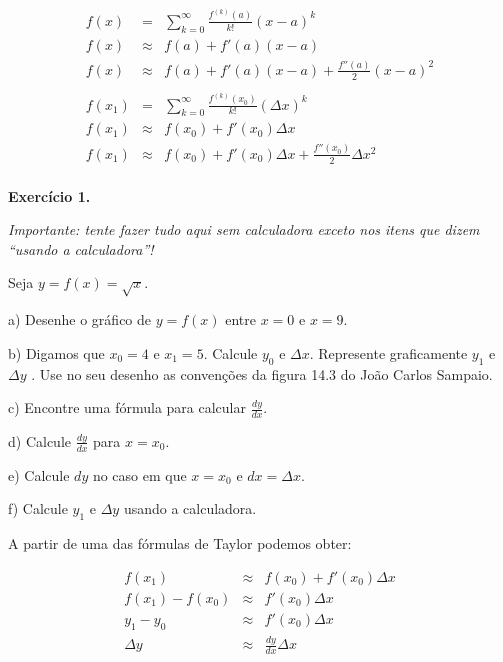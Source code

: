 \documentclass[oneside,12pt]{article}
\begin{document}
%
$$\begin{array}{rcl}
  f(x) &=& \displaystyle \sum_{k=0}^∞ \frac{f^{(k)}(a)}{k!} (x-a)^k \\[10pt]
  f(x) &≈& f(a) + f'(a)(x-a) \\
  f(x) &≈& f(a) + f'(a)(x-a) + \frac{f''(a)}{2} (x-a)^2 \\
  \\
  f(x_1) &=& \displaystyle \sum_{k=0}^∞ \frac{f^{(k)}(x_0)}{k!} (Δx)^k \\[10pt]
  f(x_1) &≈& f(x_0) + f'(x_0)Δx \\
  f(x_1) &≈& f(x_0) + f'(x_0)Δx + \frac{f''(x_0)}{2} Δx^2 \\
  \end{array}
$$


\newpage


{\bf Exercício 1.}

{\sl Importante: tente fazer tudo aqui sem calculadora exceto nos
  itens que dizem ``usando a calculadora''!}

Seja $y=f(x)=\sqrt{x}$.

a) Desenhe o gráfico de $y=f(x)$ entre $x=0$ e $x=9$.

b) Digamos que $x_0=4$ e $x_1=5$. Calcule $y_0$ e $Δx$. Represente
graficamente $y_1$ e $Δy$ .
Use no seu desenho as convenções da figura 14.3 do João Carlos
Sampaio.

c) Encontre uma fórmula para calcular $\frac{dy}{dx}$.

d) Calcule $\frac{dy}{dx}$ para $x=x_0$.

e) Calcule $dy$ no caso em que $x=x_0$ e $dx=Δx$.

f) Calcule $y_1$ e $Δy$ usando a calculadora.

\newpage


A partir de uma das fórmulas de Taylor podemos obter:

$$\begin{array}{rcl}
  f(x_1)          &≈& f(x_0) + f'(x_0)Δx \\
  f(x_1) - f(x_0) &≈& f'(x_0)Δx \\
        y_1 - y_0 &≈& f'(x_0)Δx \\
               Δy &≈& \frac{dy}{dx} Δx \\
  \end{array}
$$
\end{document}

